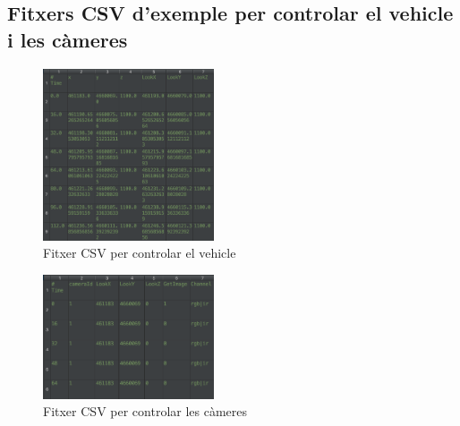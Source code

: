 \documentclass[10pt,a4paper,twocolumn,twoside]{article}
\begin{document}
\subsection{Fitxers CSV d'exemple per controlar el vehicle i les càmeres}
\label{appendix:fitxerscsv}

\begin{figure}[!h]
\centering
  	\includegraphics[width=0.45\textwidth]{fitxervehicle}
	\captionsetup{labelformat=empty}
	\caption{Fitxer CSV per controlar el vehicle}
	\label{fig-fitxervehicle}
\end{figure}


\begin{figure}[!h]
\centering
  	\includegraphics[width=0.45\textwidth]{fitxercameres}
  	\captionsetup{labelformat=empty}
	\caption{Fitxer CSV per controlar les càmeres}
	\label{fig-fitxercameres}
\end{figure}
\end{document}

